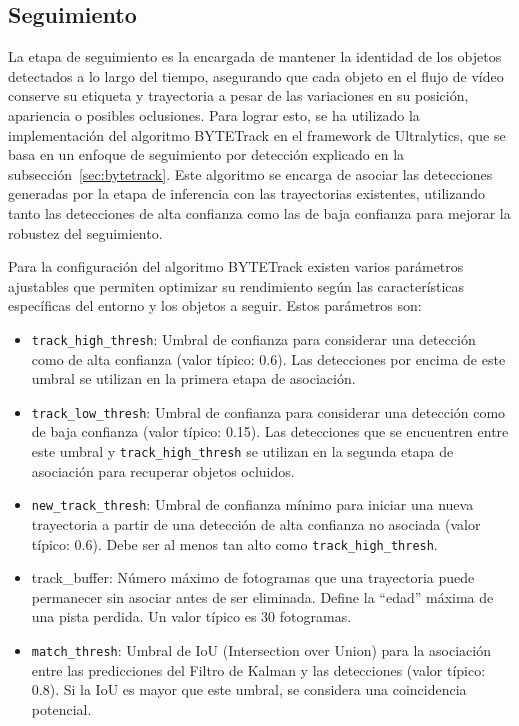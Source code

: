 \documentclass[11pt,spanish,listoffigures,listoftables]{tfgetsinf}
\begin{document}
\subsection{Seguimiento} \label{sec:seguimiento}
La etapa de seguimiento es la encargada de mantener la identidad de los objetos detectados a lo largo del tiempo, asegurando que cada objeto en el flujo de vídeo conserve su etiqueta y trayectoria a pesar de las variaciones en su posición, apariencia o posibles oclusiones. Para lograr esto, se ha utilizado la implementación del algoritmo BYTETrack en el framework de Ultralytics\cite{Jocher_Ultralytics_YOLO_2023}, que se basa en un enfoque de seguimiento por detección explicado en la subsección~\ref{sec:bytetrack}. Este algoritmo se encarga de asociar las detecciones generadas por la etapa de inferencia con las trayectorias existentes, utilizando tanto las detecciones de alta confianza como las de baja confianza para mejorar la robustez del seguimiento.

Para la configuración del algoritmo BYTETrack existen varios parámetros ajustables que permiten optimizar su rendimiento según las características específicas del entorno y los objetos a seguir. Estos parámetros son:
\begin{itemize}
   \item \texttt{track\_high\_thresh}: Umbral de confianza para considerar una detección como de alta confianza (valor típico: 0.6). Las detecciones por encima de este umbral se utilizan en la primera etapa de asociación.
   \item \texttt{track\_low\_thresh}: Umbral de confianza para considerar una detección como de baja confianza (valor típico: 0.15). Las detecciones que se encuentren entre este umbral y \texttt{track\_high\_thresh} se utilizan en la segunda etapa de asociación para recuperar objetos ocluidos.
   \item \texttt{new\_track\_thresh}: Umbral de confianza mínimo para iniciar una nueva trayectoria a partir de una detección de alta confianza no asociada (valor típico: 0.6). Debe ser al menos tan alto como \texttt{track\_high\_thresh}.
   \item track\_buffer: Número máximo de fotogramas que una trayectoria puede permanecer sin asociar antes de ser eliminada. Define la ``edad'' máxima de una pista perdida. Un valor típico es 30 fotogramas.
   \item \texttt{match\_thresh}: Umbral de IoU (Intersection over Union) para la asociación entre las predicciones del Filtro de Kalman y las detecciones (valor típico: 0.8). Si la IoU es mayor que este umbral, se considera una coincidencia potencial.
\end{itemize}
\end{document}
